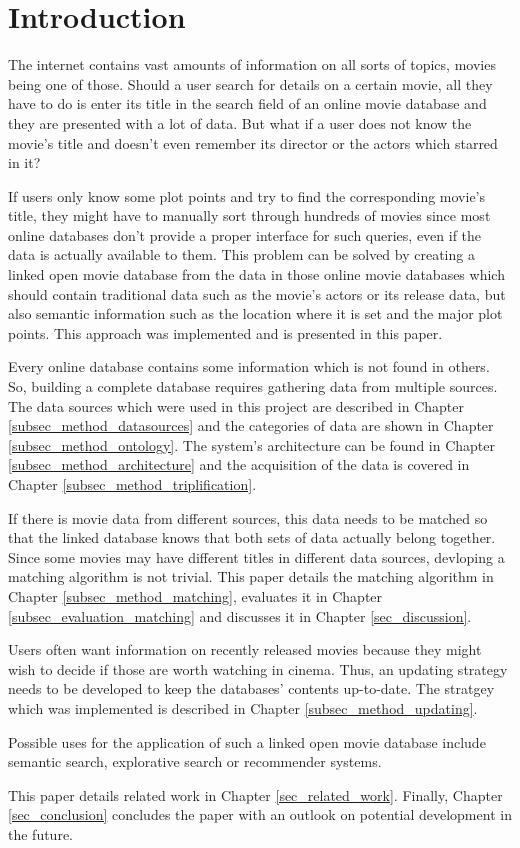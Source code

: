 \section{Introduction}
\label{sec_introduction}

The internet contains vast amounts of information on all sorts of topics, movies being one of those.
Should a user search for details on a certain movie, all they have to do is enter its title in the search field of an online movie database and they are presented with a lot of data.
But what if a user does not know the movie's title and doesn't even remember its director or the actors which starred in it?

If users only know some plot points and try to find the corresponding movie's title, they might have to manually sort through hundreds of movies since most online databases don't provide a proper interface for such queries, even if the data is actually available to them.
This problem can be solved by creating a linked open movie database from the data in those online movie databases which should contain traditional data such as the movie's actors or its release data, but also semantic information such as the location where it is set and the major plot points.
This approach was implemented and is presented in this paper.

Every online database contains some information which is not found in others.
So, building a complete database requires gathering data from multiple sources.
The data sources which were used in this project are described in Chapter \ref{subsec_method_datasources} and the categories of data are shown in Chapter \ref{subsec_method_ontology}.
The system's architecture can be found in Chapter \ref{subsec_method_architecture} and the acquisition of the data is covered in Chapter \ref{subsec_method_triplification}.

If there is movie data from different sources, this data needs to be matched so that the linked database knows that both sets of data actually belong together.
Since some movies may have different titles in different data sources, devloping a matching algorithm is not trivial.
This paper details the matching algorithm in Chapter \ref{subsec_method_matching}, evaluates it in Chapter \ref{subsec_evaluation_matching} and discusses it in Chapter \ref{sec_discussion}.

Users often want information on recently released movies because they might wish to decide if those are worth watching in cinema.
Thus, an updating strategy needs to be developed to keep the databases' contents up-to-date.
The stratgey which was implemented is described in Chapter \ref{subsec_method_updating}.

Possible uses for the application of such a linked open movie database include semantic search, explorative search or recommender systems.

This paper details related work in Chapter \ref{sec_related_work}.
Finally, Chapter \ref{sec_conclusion} concludes the paper with an outlook on potential development in the future.